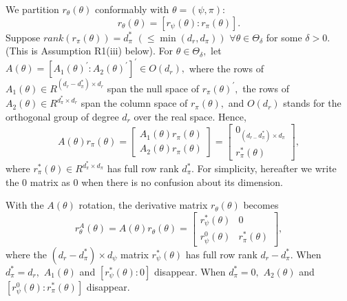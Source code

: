 \documentclass[12pt,titlepage,final,oneside,letterpaper]{article}
\begin{document}
We partition $r_{\theta }(\theta )$ conformably with $\theta =(\psi ,\pi )$:%
\begin{equation}
r_{\theta }(\theta )=[r_{\psi }(\theta ):r_{\pi }(\theta )].
\end{equation}%
Suppose $rank(r_{\pi }(\theta ))=d_{\pi }^{\ast }$ $(\leq \min (d_{r},d_{\pi
}))$ $\forall \theta \in \Theta _{\delta }$ for some $\delta >0.$ (This is
Assumption R1(iii) below). For $\theta \in \Theta _{\delta },$ let $A(\theta
)=[A_{1}(\theta )^{\prime }:A_{2}(\theta )^{\prime }]^{\prime }\in O(d_{r}),$
where the rows of $A_{1}(\theta )\in R^{(d_{r}-d_{\pi }^{\ast })\times
d_{r}} $ span the null space of $r_{\pi }(\theta )^{\prime },$ the rows of $%
A_{2}(\theta )\in R^{d_{\pi }^{\ast }\times d_{r}}$ span the column space of 
$r_{\pi }(\theta ),$ and $O(d_{r})$ stands for the orthogonal group of
degree $d_{r}$ over the real space. Hence,%
\begin{equation}
A(\theta )r_{\pi }(\theta )=\left[ 
\begin{array}{c}
A_{1}(\theta )r_{\pi }(\theta ) \\ 
A_{2}(\theta )r_{\pi }(\theta )%
\end{array}%
\right] =\left[ 
\begin{array}{c}
0_{(d_{r-}d_{\pi }^{\ast })\times d_{\pi }} \\ 
r_{\pi }^{\ast }(\theta )%
\end{array}%
\right] ,
\end{equation}%
where $r_{\pi }^{\ast }(\theta )\in R^{d_{\pi }^{\ast }\times d_{\pi }}$ has
full row rank $d_{\pi }^{\ast }.$ For simplicity, hereafter we write the $0$
matrix as $0$ when there is no confusion about its dimension.

With the $A(\theta )$ rotation, the derivative matrix $r_{\theta }(\theta )$
becomes 
\begin{equation}
r_{\theta }^{A}(\theta )=A(\theta )r_{\theta }(\theta )=\left[ 
\begin{array}{cc}
r_{\psi }^{\ast }(\theta ) & 0 \\ 
r_{\psi }^{0}(\theta ) & r_{\pi }^{\ast }(\theta )%
\end{array}%
\right] ,  \label{r_A matrix}
\end{equation}%
where the $(d_{r}-d_{\pi }^{\ast })\times d_{\psi }$ matrix $r_{\psi }^{\ast
}(\theta )$ has full row rank $d_{r}-d_{\pi }^{\ast }.$ When $d_{\pi }^{\ast
}=d_{r},$ $A_{1}(\theta )$ and $[r_{\psi }^{\ast }(\theta ):0]$ disappear.
When $d_{\pi }^{\ast }=0,$ $A_{2}(\theta )$ and $[r_{\psi }^{0}(\theta
):r_{\pi }^{\ast }(\theta )]$ disappear.
\end{document}
